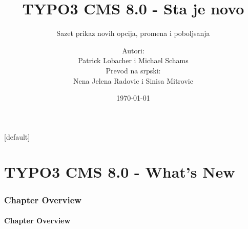 \documentclass[t]{beamer}
\title{TYPO3 CMS 8.0 - Sta je novo}
\subtitle{Sazet prikaz novih opcija, promena i poboljsanja}
\author{
	\centerline{Autori:}
	\centerline{Patrick Lobacher i Michael Schams}
	\centerline{Prevod na srpski:}
	\centerline{Nena Jelena Radovic i Sinisa Mitrovic}
}
\date{\today}
\begin{document}
\sharefont


\begingroup
	[default]
	\begin{frame}
		\titlepage
	\end{frame}
\endgroup


\section*{TYPO3 CMS 8.0 - What's New}
\begin{frame}[fragile]
	\frametitle{Chapter Overview}
	\framesubtitle{Chapter Overview}

	\tableofcontents

\end{frame}










\end{document}
